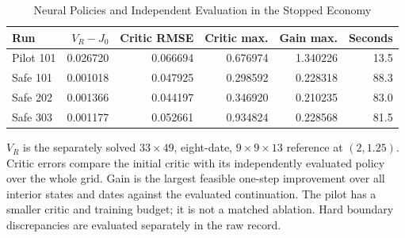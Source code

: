 \begin{table}[tbp]
\centering
\caption{Neural Policies and Independent Evaluation in the Stopped Economy}
\label{tab:ndu_neural}
\small
\begin{tabular}{@{}lrrrrr@{}}
\toprule
Run & $V_R-J_0$ & Critic RMSE & Critic max. & Gain max. & Seconds \\
\midrule
Pilot 101 & 0.026720 & 0.066694 & 0.676974 & 1.340226 & 13.5 \\
Safe 101 & 0.001018 & 0.047925 & 0.298592 & 0.228318 & 88.3 \\
Safe 202 & 0.001366 & 0.044197 & 0.346920 & 0.210235 & 83.0 \\
Safe 303 & 0.001177 & 0.052661 & 0.934824 & 0.228568 & 81.5 \\
\bottomrule
\end{tabular}
\par\smallskip\begin{minipage}{\linewidth}\footnotesize $V_R$ is the separately solved $33\times49$, eight-date, $9\times9\times13$ reference at $(2,1.25)$. Critic errors compare the initial critic with its independently evaluated policy over the whole grid. Gain is the largest feasible one-step improvement over all interior states and dates against the evaluated continuation. The pilot has a smaller critic and training budget; it is not a matched ablation. Hard boundary discrepancies are evaluated separately in the raw record.\end{minipage}
\end{table}
